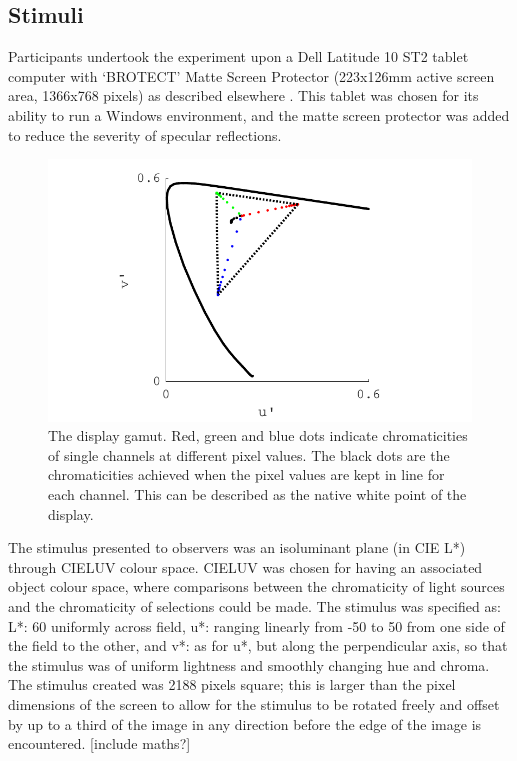 \subsection{Stimuli}

Participants undertook the experiment upon a Dell Latitude 10 ST2 tablet computer with `BROTECT' Matte Screen Protector (223x126mm active screen area, 1366x768 pixels) as described elsewhere \citep{garside_estimating_2016}. This tablet was chosen for its ability to run a Windows environment, and the matte screen protector was added to reduce the severity of specular reflections. 

\begin{figure}[hbp]
\includegraphics[width=\textwidth]{figs/tablet/gamut.pdf}
\caption{The display gamut. Red, green and blue dots indicate chromaticities of single channels at different pixel values. The black dots are the chromaticities achieved when the pixel values are kept in line for each channel. This can be described as the native white point of the display.}
\label{fig:gamut}
\end{figure}

The stimulus presented to observers was an isoluminant plane (in CIE L*) through CIELUV colour space. CIELUV was chosen for having an associated object colour space, where comparisons between the chromaticity of light sources and the chromaticity of selections could be made. The stimulus was specified as: L*: 60 uniformly across field, u*: ranging linearly from -50 to 50 from one side of the field to the other, and v*: as for u*, but along the perpendicular axis, so that the stimulus was of uniform lightness and smoothly changing hue and chroma. The stimulus created was 2188 pixels square; this is larger than the pixel dimensions of the screen to allow for the stimulus to be rotated freely and offset by up to a third of the image in any direction before the edge of the image is encountered. [include maths?]

